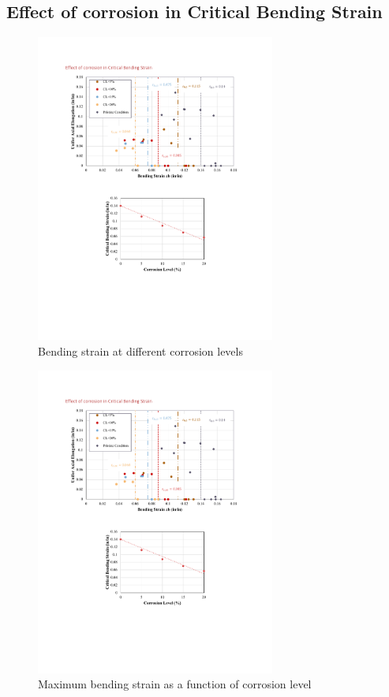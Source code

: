 \subsection{Effect of corrosion in Critical Bending Strain}
\begin{figure}[htbp]
	\centering
	\includegraphics[width=0.7\textwidth]{VAC Thesis 2.0/Chapter-4/figs/BBT_results_.pdf}
	\caption{Bending strain at different corrosion levels}
	\label{fig:BBT_strains}
\end{figure}
\begin{figure}[htbp]
	\centering
	\includegraphics[width=0.7\textwidth]{VAC Thesis 2.0/Chapter-4/figs/BBT_results_summary.pdf}
	\caption{Maximum bending strain as a function of corrosion level}
	\label{fig:eb_vs_CL}
\end{figure}
